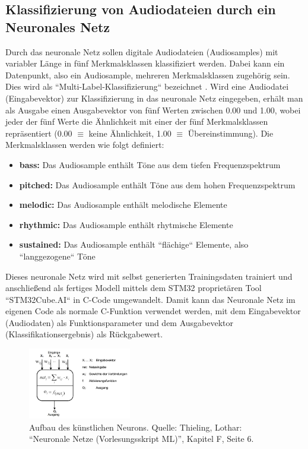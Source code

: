 \subsection{Klassifizierung von Audiodateien durch ein Neuronales Netz}
Durch das neuronale Netz sollen digitale Audiodateien (Audiosamples) mit variabler Länge in fünf Merkmalsklassen klassifiziert werden. Dabei kann ein Datenpunkt, also ein Audiosample, mehreren Merkmalsklassen zugehörig sein. Dies wird als ``Multi-Label-Klassifizierung`` bezeichnet \cite{multilabel-classification}. Wird eine Audiodatei (Eingabevektor) zur Klassifizierung in das neuronale Netz eingegeben, erhält man als Ausgabe einen Ausgabevektor von fünf Werten zwischen 0.00 und 1.00, wobei jeder der fünf Werte  die Ähnlichkeit mit einer der fünf Merkmalsklassen repräsentiert (0.00 $\equiv$ keine Ähnlichkeit, 1.00 $\equiv$ Übereinstimmung). Die Merkmalsklassen werden wie folgt definiert:
    \begin{itemize}
        \item \textbf{bass:} Das Audiosample enthält Töne aus dem tiefen Frequenzspektrum
       	\item \textbf{pitched:} Das Audiosample enthält Töne aus dem hohen Frequenzspektrum
        \item \textbf{melodic:} Das Audiosample enthält melodische Elemente
        \item \textbf{rhythmic:} Das Audiosample enthält rhytmische Elemente
        \item \textbf{sustained:} Das Audiosample enthält ``flächige`` Elemente, also ``langgezogene`` Töne
    \end{itemize}

Dieses neuronale Netz wird mit selbst generierten Trainingsdaten trainiert und anschließend als fertiges Modell mittels dem STM32 proprietären Tool ``STM32Cube.AI`` in C-Code umgewandelt. Damit kann das Neuronale Netz im eigenen Code als normale C-Funktion verwendet werden, mit dem Eingabevektor (Audiodaten) als Funktionsparameter und dem Ausgabevektor (Klassifikationsergebnis) als Rückgabewert. \cite{stm32-cube-ai-documentation}

\begin{figure}
    \centering
    \includegraphics[width=0.4\textwidth]{images/08_durchfuehrung/nn/neuron-aufbau.png}
    \caption{Aufbau des künstlichen Neurons. Quelle: Thieling, Lothar: “Neuronale Netze (Vorlesungsskript ML)”, Kapitel F, Seite 6.}
    \label{fig:img-aufbau-neuron}
\end{figure}


